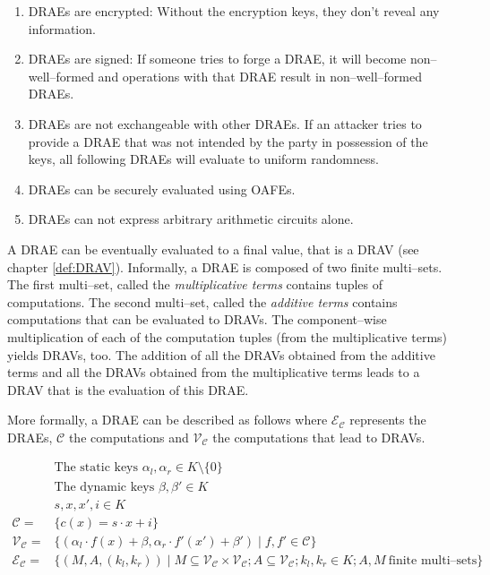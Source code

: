 \begin{enumerate}

  \item \label{prop:drae-encrypted} DRAEs are encrypted: Without the encryption
    keys, they don't reveal any information.

  \item \label{prop:drae-signed} DRAEs are signed: If someone tries to forge a
    DRAE, it will become non--well--formed and operations with that DRAE result
    in non--well--formed DRAEs.

  \item DRAEs are not exchangeable with other DRAEs. If an attacker tries to
    provide a DRAE that was not intended by the party in possession of the keys,
    all following DRAEs will evaluate to uniform randomness.

  \item \label{prop:drae-oafe} DRAEs can be securely evaluated using OAFEs.

  \item \label{prop:drae-not-enough} DRAEs can not express arbitrary arithmetic
    circuits alone.

\end{enumerate}

\noindent{}A DRAE can be eventually evaluated to a final value, that is a DRAV
(see chapter \ref{def:DRAV}). Informally, a DRAE is composed of two finite
multi--sets. The first multi--set, called the \emph{multiplicative terms}
contains tuples of computations. The second multi--set, called the
\emph{additive terms} contains computations that can be evaluated to DRAVs. The
component--wise multiplication of each of the computation tuples (from the
multiplicative terms) yields DRAVs, too. The addition of all the DRAVs obtained
from the additive terms and all the DRAVs obtained from the multiplicative terms
leads to a DRAV that is the evaluation of this DRAE.

More formally, a DRAE can be described as follows where
$\mathcal{E}_\mathcal{C}$ represents the DRAEs, $\mathcal{C}$ the computations
and $\mathcal{V}_\mathcal{C}$ the computations that lead to DRAVs.

\begin{align}
%
  &\text{The static keys } \alpha_l, \alpha_r \in K \setminus \{0\} \nonumber\\
%
  &\text{The dynamic keys } \beta, \beta' \in K \nonumber\\
%
  &s, x, x', i \in K \nonumber\\
%
  \mathcal{C} = & \{ c(x) = s \cdot x + i \} \nonumber\\
%
  \mathcal{V}_\mathcal{C} = & \{ (\alpha_l \cdot f(x) + \beta,
                      \alpha_r \cdot f'(x') + \beta' )
                    \mid f, f' \in \mathcal{C} \} \nonumber\\
%
  \label{rel:DRAE}
  \mathcal{E}_\mathcal{C} = & \{ (M, A, (k_l, k_r)) \mid
      M \subseteq \mathcal{V}_\mathcal{C} \times
      \mathcal{V}_\mathcal{C}; A \subseteq \mathcal{V}_\mathcal{C};
      k_l, k_r \in K;
      A, M~\text{finite multi--sets} \}
%
\end{align}

